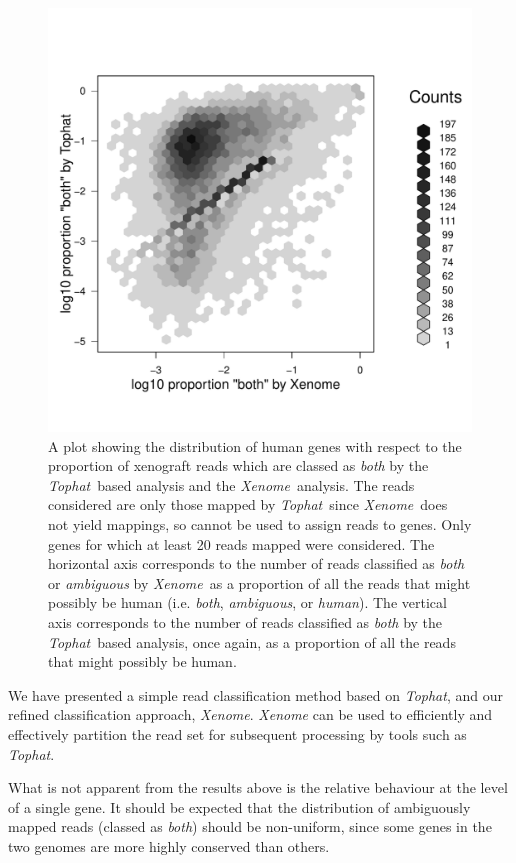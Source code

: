 \documentclass{bioinfo}
\newcommand{\Xenome}{\textit{Xenome}{}}
\newcommand{\Tophat}{\textit{Tophat}{}}
\begin{document}
\begin{figure}
\includegraphics[scale=0.5]{rel-ambiguity.pdf}
\caption{A plot showing the distribution of human genes with respect to the
proportion of xenograft reads which are classed as \textit{both}
by the \Tophat\ based analysis and the \Xenome\ analysis.
The reads considered are only those mapped by \Tophat\ since \Xenome\
does not yield mappings, so cannot be used to assign reads to genes.
Only genes for which at least 20 reads mapped were considered.
The horizontal axis corresponds to the number of reads classified as \textit{both} or \textit{ambiguous} by \Xenome\ as a proportion of all the reads
that might possibly be human (i.e. \textit{both}, \textit{ambiguous}, or
\textit{human}).
The vertical axis corresponds to the number of reads classified as \textit{both}
by the \Tophat\ based analysis, once again, as a proportion of all the reads
that might possibly be human.
}
\label{fig:amb}
\end{figure}

We have presented a simple read classification method based on
\textit{Tophat}, and our refined classification approach, \textit{Xenome}.
\textit{Xenome} can be used to efficiently and effectively partition
the read set for subsequent processing by tools such as \Tophat.

What is not apparent from the results above is the
relative behaviour at the level of a single gene.
It should be expected that the distribution of ambiguously mapped reads
(classed as \textit{both}) should be non-uniform, since some genes in 
the two genomes are more highly conserved than others.
\end{document}
